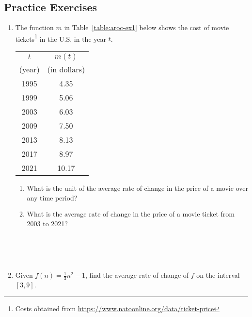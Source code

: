 

\newpage


\subsection*{Practice Exercises} \label{practice-difference-quotient}

\begin{myPractice}
\begin{enumerate}

\item The function $m$ in Table~\ref{table:aroc-ex1} below shows the cost of movie tickets\footnote{Costs obtained from \url{https://www.natoonline.org/data/ticket-price} } in the U.S. in the year $t$.


	\begin{minipage}{0.3\linewidth}
		\renewcommand\arraystretch{1.5}
		\begin{tabular}{c|c}
			$t$ & $m(t)$\\
			(year) & (in dollars)\\
			\hline
			1995 & 4.35\\
			1999 & 5.06\\
			2003 & 6.03\\
			2009 & 7.50\\
			2013 & 8.13\\
			2017 & 8.97\\
			2021 & 10.17
		\end{tabular}
		\label{table:aroc-ex1}
	\end{minipage}
	\begin{minipage}{0.7\linewidth}
\begin{enumerate}
\item	What is the unit of the average rate of change in the price of a movie over any time period? \\[2cm]
\item	What is the average rate of change in the price of a movie ticket from 2003 to 2021? \\[4cm]
\end{enumerate}
		\end{minipage}
~\\~\\~\\
	
	\item Given $f(n) = \frac{1}{3}n^2-1$, find the average rate of change of $f$ on the interval $[3,9]$.
	\vfill
	
\end{enumerate}
\end{myPractice}

